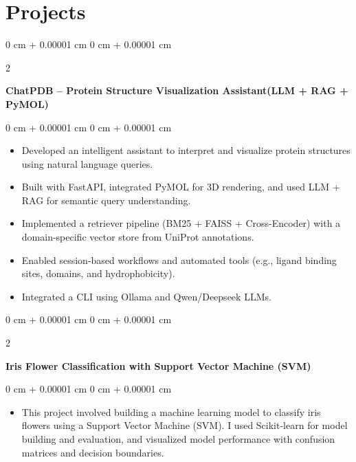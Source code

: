 \documentclass[10pt, letterpaper]{article}
\newenvironment{highlights}{
    \begin{itemize}[
        topsep=0.10 cm,
        parsep=0.10 cm,
        partopsep=0pt,
        itemsep=0pt,
        leftmargin=0 cm + 10pt
    ]
}{
    \end{itemize}
} %
\newenvironment{onecolentry}{
    \begin{adjustwidth}{
        0 cm + 0.00001 cm
    }{
        0 cm + 0.00001 cm
    }
}{
    \end{adjustwidth}
} %
\newenvironment{twocolentry}[2][]{
    \onecolentry
    \def\secondColumn{#2}
    \setcolumnwidth{\fill, 4.5 cm}
    \begin{paracol}{2}
}{
    \switchcolumn \raggedleft \secondColumn
    \end{paracol}
    \endonecolentry
} %
\begin{document}
    \section{Projects}


        \begin{twocolentry}{
        }
            \textbf{ChatPDB – Protein Structure Visualization Assistant(LLM + RAG + PyMOL)}\end{twocolentry}

        \vspace{0.10 cm}
        \begin{onecolentry}
            \begin{highlights}
            \item Developed an intelligent assistant to interpret and visualize protein structures using natural language queries.
            \item Built with FastAPI, integrated PyMOL for 3D rendering, and used LLM + RAG for semantic query understanding.
            \item Implemented a retriever pipeline (BM25 + FAISS + Cross-Encoder) with a domain-specific vector store from UniProt annotations.
            \item Enabled session-based workflows and automated tools (e.g., ligand binding sites, domains, and hydrophobicity).
            \item Integrated a CLI using Ollama and Qwen/Deepseek LLMs.
            \end{highlights}
        \end{onecolentry}

        \vspace{0.2 cm}

        \begin{twocolentry}{
        }
            \textbf{Iris Flower Classification with Support Vector Machine (SVM)}\end{twocolentry}

        \vspace{0.10 cm}
        \begin{onecolentry}
            \begin{highlights}
                \item This project involved building a machine learning model to classify iris flowers using a Support Vector Machine (SVM). I used Scikit-learn for model building and evaluation, and visualized model performance with confusion matrices and decision boundaries.
            \end{highlights}
        \end{onecolentry}
\end{document}
